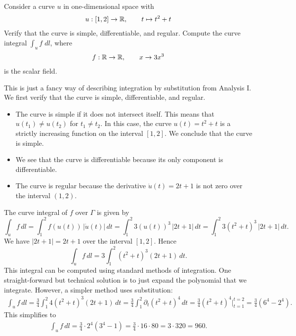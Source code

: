 \documentclass[11pt]{article}
\begin{document}





\begin{exercise}
    Consider a curve $u$ in one-dimensional space with
    \begin{align*}
        u : [1,2] \rightarrow \mathbb{R}, \qquad t \mapsto t^2 + t
    \end{align*}
    Verify that the curve is simple, differentiable, and regular. Compute the curve integral $\int_u f \;dl$, where 
    \begin{align*}
        f : \mathbb{R} \rightarrow \mathbb{R}, \qquad x \rightarrow 3x^3
    \end{align*}
    is the scalar field.
\end{exercise}
\begin{solution}
    This is just a fancy way of describing integration by substitution from Analysis I.
    We first verify that the curve is simple, differentiable, and regular.
    \begin{itemize}
        \item 
        The curve is simple if it does not intersect itself. This means that $u(t_1) \neq u(t_2)$ for $t_1 \neq t_2$. 
        In this case, the curve $u(t) = t^2 + t$ is a strictly increasing function on the interval $[1,2]$.
        We conclude that the curve is simple. 
        \item 
        We see that the curve is differentiable because its only component is differentiable. 
        \item 
        The curve is regular because the derivative $\dot u(t) = 2t + 1$ is not zero over the interval $(1,2)$. 
    \end{itemize}
    The curve integral of $f$ over $\Gamma$ is given by
    \[
        \int_u f \, dl = \int_1^2 f(u(t)) \, |\dot u(t)| \, dt 
        = 
        \int_1^2 3(u(t))^3 \, |2t+1| \, dt 
        = 
        \int_1^2 3(t^2 + t)^3 \, |2t+1| \, dt 
        .
    \]
    We have $|2t+1| = 2t+1$ over the interval $[1,2]$. Hence
    \[
        \int_u f \, dl = 3 \int_1^2 (t^2 + t)^3 (2t + 1) \, dt.
    \]
    This integral can be computed using standard methods of integration. 
    One straight-forward but technical solution is to just expand the polynomial that we integrate. 
	However, a simpler method uses substitution:
    \begin{align}
        \int_u f \, dl 
        = 
        \frac 3 4 \int_1^2 4(t^2 + t)^3 (2t + 1) \, dt
        = 
        \frac 3 4 \int_1^2 \partial_t (t^2 + t)^4 \, dt
        = 
        \frac 3 4 (t^2 + t)^4 |_{t=1}^{t=2}
        = 
        \frac 3 4 \left( 6^4 - 2^4 \right)
        .
    \end{align}
    This simplifies to 
    \begin{align}
        \int_u f \, dl 
        = 
        \frac 3 4 \cdot 2^4 \left( 3^4 - 1 \right) = \frac 3 4 \cdot 16 \cdot 80 = 3 \cdot 320 = 960
        .
    \end{align}
\end{solution}
\end{document}
